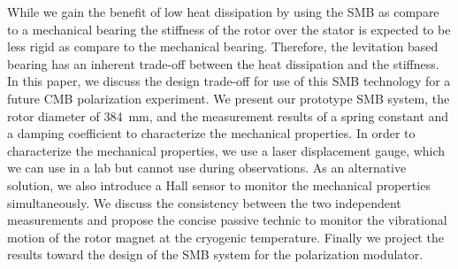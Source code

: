 \documentclass[a4paper,11pt]{jpconf}
\newcommand{\cred}[1]{{\color{red}#1}}
\begin{document}
While we gain the benefit of low heat dissipation by using the SMB as compare to a mechanical bearing 
the stiffness of the rotor over the stator is expected to be less rigid as compare to the mechanical bearing.
Therefore, the levitation based bearing has an inherent trade-off between the heat dissipation and the stiffness.
In this paper, we discuss the design trade-off for use of this SMB technology for a future CMB polarization experiment.
We present our prototype SMB system, the rotor diameter of 384~mm, and the measurement results of a spring constant and a damping coefficient to characterize the mechanical properties.
In order to characterize the mechanical properties, we use a laser displacement gauge, which we can use in a lab but cannot use during observations.
As an alternative solution, we also introduce a Hall sensor to monitor the mechanical properties simultaneously.
We discuss the consistency between the two independent measurements and propose the concise passive technic to monitor the vibrational motion of the rotor magnet at the cryogenic temperature.
Finally we project the results toward the design of the SMB system for the polarization modulator.

\end{document}
